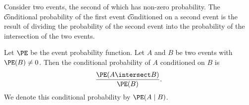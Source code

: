 


Consider two events, the second of which has non-zero probability.
The \t{conditional probability} of the first event \t{conditioned} on a second event is the result of dividing the probability of the second event into the probability of the intersection of the two events.


Let $\PE$ be the event probability function.
Let $A$ and $B$ be two events with $\PE(B) \neq 0$.
Then the conditional probability of $A$ conditioned on $B$ is
\[
  \frac{\PE(A \intersect B)}{\PE(B)}.
\]
We denote this conditional probability by $\PE(A \mid B)$.

\blankpage
